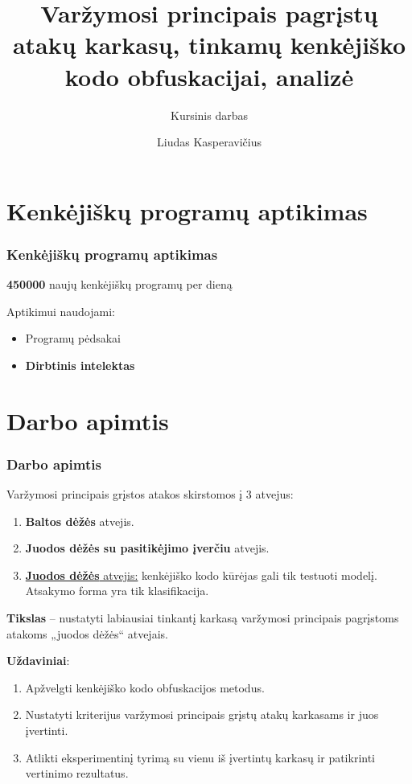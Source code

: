 \documentclass[12pt]{beamer}
\title[]{Varžymosi principais pagrįstų atakų karkasų, tinkamų kenkėjiško kodo obfuskacijai, analizė}
\subtitle[]{Kursinis darbas}
\author[Liudas Kasperavičius]{Liudas Kasperavičius}
\date{}
\newcommand{\enquote}[1]{„#1“}
\begin{document}
\begin{frame}
    \titlepage
\end{frame}

\section{Kenkėjiškų programų aptikimas}
\begin{frame}
    \frametitle{Kenkėjiškų programų aptikimas}
    \begin{center}
        \huge\textbf{450000} naujų kenkėjiškų programų per dieną \large{\cite{MalwareStatisticsTrendsa}}
    \end{center}\pause

    \vspace{40pt}
    Aptikimui naudojami:
    \begin{itemize}
        \item Programų pėdsakai\pause
        \item \textbf{Dirbtinis intelektas}
    \end{itemize}
\end{frame}

\section{Darbo apimtis}
\begin{frame}
    \frametitle{Darbo apimtis}

    Varžymosi principais grįstos atakos skirstomos į 3 atvejus:
    \begin{enumerate}
        \item \textbf{Baltos dėžės} atvejis.
        \item \textbf{Juodos dėžės su pasitikėjimo įverčiu} atvejis.
        \item \underline{\textbf{Juodos dėžės} atvejis:} kenkėjiško kodo kūrėjas gali tik testuoti modelį. Atsakymo forma yra tik klasifikacija.
    \end{enumerate} \pause
    \vspace{10pt}

    \textbf{Tikslas} -- nustatyti labiausiai tinkantį karkasą varžymosi principais pagrįstoms atakoms \enquote{juodos dėžės} atvejais. \pause

    \textbf{Uždaviniai}:
    \begin{enumerate}
        \item Apžvelgti kenkėjiško kodo obfuskacijos metodus.
        \item Nustatyti kriterijus varžymosi principais grįstų atakų karkasams ir juos
              įvertinti.
        \item Atlikti eksperimentinį tyrimą su vienu iš įvertintų karkasų ir patikrinti
              vertinimo rezultatus.
    \end{enumerate}

\end{frame}
\end{document}
